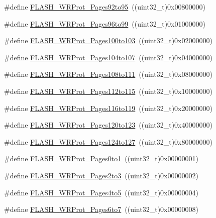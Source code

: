 \begin{DoxyCompactItemize}
\item 
\#define \hyperlink{group__Option__Bytes__Write__Protection_gab7d95c1f574523ef827bafd01a64b0bb}{FLASH\_\-WRProt\_\-Pages92to95}~((uint32\_\-t)0x00800000)
\item 
\#define \hyperlink{group__Option__Bytes__Write__Protection_ga8f3ea488c33b3e209cab996545f55c49}{FLASH\_\-WRProt\_\-Pages96to99}~((uint32\_\-t)0x01000000)
\item 
\#define \hyperlink{group__Option__Bytes__Write__Protection_ga0c03cee6931c623ccdaae19233c81f4e}{FLASH\_\-WRProt\_\-Pages100to103}~((uint32\_\-t)0x02000000)
\item 
\#define \hyperlink{group__Option__Bytes__Write__Protection_ga2e096d51e61a972c97093110211b3be5}{FLASH\_\-WRProt\_\-Pages104to107}~((uint32\_\-t)0x04000000)
\item 
\#define \hyperlink{group__Option__Bytes__Write__Protection_ga899e34df1ab5369d840461686eb9c318}{FLASH\_\-WRProt\_\-Pages108to111}~((uint32\_\-t)0x08000000)
\item 
\#define \hyperlink{group__Option__Bytes__Write__Protection_gacd2d5839240b77f70be15e76086745ab}{FLASH\_\-WRProt\_\-Pages112to115}~((uint32\_\-t)0x10000000)
\item 
\#define \hyperlink{group__Option__Bytes__Write__Protection_ga1283655c7c974e0de142cec7921c8673}{FLASH\_\-WRProt\_\-Pages116to119}~((uint32\_\-t)0x20000000)
\item 
\#define \hyperlink{group__Option__Bytes__Write__Protection_gac8d2f42123810fefc68572709d8830ec}{FLASH\_\-WRProt\_\-Pages120to123}~((uint32\_\-t)0x40000000)
\item 
\#define \hyperlink{group__Option__Bytes__Write__Protection_gae6e70db5200b52248c9ec4293ff9890e}{FLASH\_\-WRProt\_\-Pages124to127}~((uint32\_\-t)0x80000000)
\item 
\#define \hyperlink{group__Option__Bytes__Write__Protection_ga7dfbb58b90b63afef11bfcf7a8f109e2}{FLASH\_\-WRProt\_\-Pages0to1}~((uint32\_\-t)0x00000001)
\item 
\#define \hyperlink{group__Option__Bytes__Write__Protection_gaeeb592e66053dde68ebb3ff3926d033d}{FLASH\_\-WRProt\_\-Pages2to3}~((uint32\_\-t)0x00000002)
\item 
\#define \hyperlink{group__Option__Bytes__Write__Protection_ga2835294ea5c096360cc5683b7f90b543}{FLASH\_\-WRProt\_\-Pages4to5}~((uint32\_\-t)0x00000004)
\item 
\#define \hyperlink{group__Option__Bytes__Write__Protection_ga289b919ff7f6e7287facf108b8b94619}{FLASH\_\-WRProt\_\-Pages6to7}~((uint32\_\-t)0x00000008)

\end{DoxyCompactItemize}
